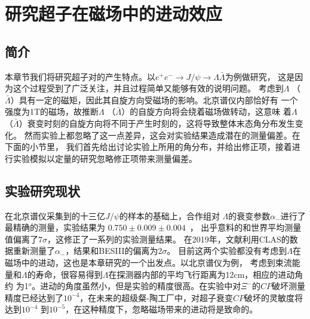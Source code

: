 ﻿%
%
%
\chapter{研究超子在磁场中的进动效应}
\section{简介}%
本章节我们将研究超子对的产生特点。以$e^{+}e^{-} \to J/\psi \to \Lambda \bar{\Lambda}$为例做研究，
这是因为这个过程受到了广泛关注，并且过程简单又能够有效的说明问题。
考虑到$\Lambda$ （$\bar{\Lambda}$）具有一定的磁矩，因此其自旋方向受磁场的影响。北京谱仪内部恰好有
一个强度为1T的磁场，故推断$\Lambda$ （$\bar{\Lambda}$）的自旋方向将会绕着磁场做转动，这意味
着$\Lambda$ （$\bar{\Lambda}$）衰变时刻的自旋方向将不同于产生时刻的，这将导致整体末态角分布发生变化。
然而实验上\cite{Ablikim:2018zay, Ireland:2019uja, Ablikim:2017tys,
Ablikim:2005cda,Aubert:2007uf, Ablikim:2012bw, Aubert:2009am}都忽略了这一点差异，这会对实验结果造成潜在的测量偏差。在下面的小节里，
我们首先给出讨论实验上所用的角分布，并给出修正项，接着进行实验模拟以定量的研究忽略修正项带来测量偏差。

\section{实验研究现状}
在北京谱仪采集到的十三亿$J/\psi$的样本的基础上，合作组对
$\Lambda$的衰变参数$\alpha_{-}$进行了最精确的测量，实验结果为 $0.750 \pm 0.009 \pm 0.004$~\cite{Ablikim:2018zay}，
出乎意料的和世界平均测量值偏离了7$\sigma$，这修正了一系列的实验测量结果。
在2019年，文献\cite{Ireland:2019uja}利用CLAS的数据重新测量了$\alpha_{-}$，结果和BESIII的偏离为2$\sigma$。
目前这两个实验都没有考虑到$\Lambda$在磁场中的进动，这也是本章研究的一个出发点。以北京谱仪为例，
考虑到束流能量和$\Lambda$的寿命，很容易得到$\Lambda$在探测器内部的平均飞行距离为12cm，相应的进动角约
为1$^o$。进动的角度虽然小，但是实验的精度很高。在实验\cite{Holmstrom:2004ar}中对$\Xi^{-}$的$CP$破坏测量
精度已经达到了$10^{-4}$，在未来的超级粲-陶工厂中，对超子衰变$CP$破坏的灵敏度将达到$10^{-4}$
到$10^{-5}$\cite{Bigi:2017eni}，在这种精度下，忽略磁场带来的进动将是致命的。

